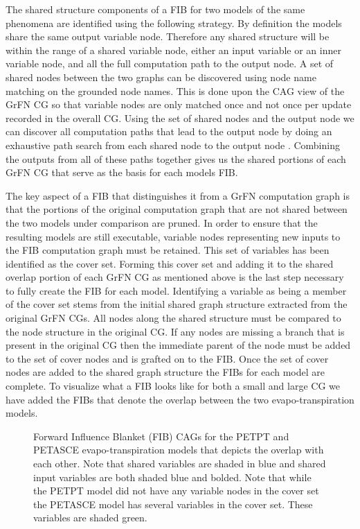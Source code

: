 The shared structure components of a FIB for two models of the same phenomena are identified using the following strategy.
By definition the models share the same output variable node.
Therefore any shared structure will be within the range of a shared variable node, either an input variable or an inner variable node, and all the full computation path to the output node.
A set of shared nodes between the two graphs can be discovered using node name matching on the grounded node names.
This is done upon the CAG view of the GrFN CG so that variable nodes are only matched once and not once per update recorded in the overall CG.
Using the set of shared nodes and the output node we can discover all computation paths that lead to the output node by doing an exhaustive path search from each shared node to the output node \citep{sedgewick2002algorithmsInC}.
Combining the outputs from all of these paths together gives us the shared portions of each GrFN CG that serve as the basis for each models FIB.

The key aspect of a FIB that distinguishes it from a GrFN computation graph is that the portions of the original computation graph that are not shared between the two models under comparison are pruned.
In order to ensure that the resulting models are still executable, variable nodes representing new inputs to the FIB computation graph must be retained.
This set of variables has been identified as the cover set.
Forming this cover set and adding it to the shared overlap portion of each GrFN CG as mentioned above is the last step necessary to fully create the FIB for each model.
Identifying a variable as being a member of the cover set stems from the initial shared graph structure extracted from the original GrFN CGs.
All nodes along the shared structure must be compared to the node structure in the original CG.
If any nodes are missing a branch that is present in the original CG then the immediate parent of the node must be added to the set of cover nodes and is grafted on to the FIB.
Once the set of cover nodes are added to the shared graph structure the FIBs for each model are complete.
To visualize what a FIB looks like for both a small and large CG we have added the FIBs that denote the overlap between the two evapo-transpiration models.

\FloatBarrier
\begin{figure}[!tbp]
  \centering

  \caption[Forward Influence Blanket CAG Examples]{Forward Influence Blanket (FIB) CAGs for the PETPT and PETASCE evapo-transpiration models that depicts the overlap with each other. Note that shared variables are shaded in blue and shared input variables are both shaded blue and bolded. Note that while the PETPT model did not have any variable nodes in the cover set the PETASCE model has several variables in the cover set. These variables are shaded green.}
\end{figure}
\FloatBarrier

